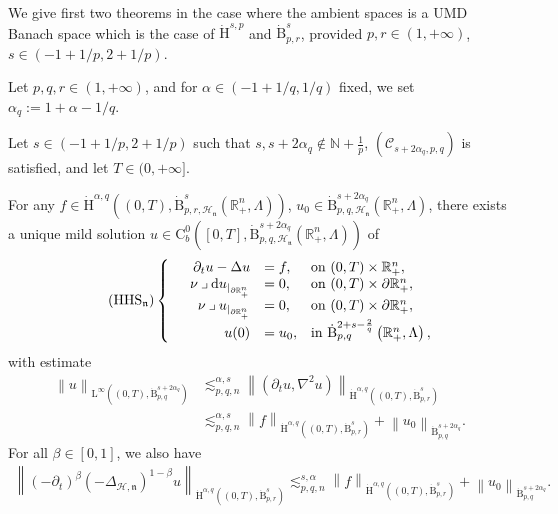\documentclass[AHL,Unicode,longabstracts,published]{cedram}
\newcommand{\bbR}{\mathbb{R}}
\newcommand{\bbN}{\mathbb{N}}
\newcommand{\rmH}{\mathrm{H}}%
\newcommand{\rmB}{\mathrm{B}}
\newcommand{\rmd}{\mathrm{d}}
\newcommand{\rmL}{\mathrm{L}}
\newcommand{\rmC}{\mathrm{C}}
\newcommand{\clH}{\mathcal{H}}
\newcommand{\clC}{\mathcal{C}}
\newcommand{\fkn}{\mathfrak{n}}
\newcommand{\iprod}{\mathbin{\lrcorner}}
\begin{document}
We give first two theorems in the case where the ambient spaces is a UMD Banach space which is the case of $\dot{\rmH}^{s,p}$ and $\dot{\rmB}^{s}_{p,r}$, provided $p,r\in(1,+\infty)$, $s\in(-1+1/p,2+1/p)$.

\begin{theo}\label{thm:MaxRxBesovUMDHodgeStokesRn+}
Let $p,q,r\in(1,+\infty)$, and for $\alpha\in(-1+1/q,1/q)$ fixed, we set $\alpha_q:= 1+\alpha-1/q$.

Let $s\in(-1+1/p,2+1/p)$ such that $s,s+2\alpha_q\notin \bbN +\frac{1}{p}$, $(\clC_{s+2\alpha_q,p,q})$ is satisfied, and let $T\in(0,+\infty]$.

For any $f\in \dot{\rmH}^{\alpha,q}((0,T),\dot{\rmB}^{s}_{p,r,\clH_\fkn}(\bbR^n_+,\Lambda))$, $u_0\in \dot{\rmB}^{s+2\alpha_q}_{p,q,\clH_\fkn}(\bbR^n_+,\Lambda)$, there exists a unique mild solution $u \in \rmC ^0_b([0,T],\dot{\rmB}^{s+2\alpha_q}_{p,q,\clH_\fkn}(\bbR^n_+,\Lambda))$ of
\begin{equation*}
\tag{HHS${}_{\fkn}$}\label{eq:HodgeHeatSystem}
\left\{
\begin{array}{rrll}
&{\partial_t u - \Delta u}  &{= f,} &{\text{on } (0,T)\times\bbR^n_+,}\\
&{\nu\iprod\rmd u_{|_{\partial\bbR^n_+}}} &{=  0,}
&{\text{on } (0,T)\times\partial\bbR^n_+,}\\
&{\nu\iprod u_{|_{\partial\bbR^n_+}}} &{=  0,}
&{\text{on } (0,T)\times\partial\bbR^n_+,}\\
&{u(0)} &{=  u_0,} &{\text{in } \dot{\rmB}^{2+s-\frac{2}{q}}_{p,q}\left(\bbR^n_+,\Lambda\right),}
\end{array}\right.
\end{equation*}
with estimate
\begin{align*}
\left\| u \right\|_{\rmL^\infty((0,T),\dot{\rmB}^{s+2\alpha_q}_{p,q})} &\lesssim_{p,q,n}^{\alpha,s} \left\| \left(\partial_t u, \nabla^2 u\right) \right\|_{\dot{\rmH}^{\alpha,q}\left((0,T),\dot{\rmB}^{s}_{p,r}\right)}\\
&\lesssim_{p,q,n}^{\alpha,s} \left\| f \right\|_{\dot{\rmH}^{\alpha,q}\left((0,T),\dot{\rmB}^{s}_{p,r}\right)}+ \left\| u_0 \right\|_{\dot{\rmB}^{s+2\alpha_q}_{p,q}}.
\end{align*}
For all $\beta\in[0,1]$, we also have
\begin{align}\label{eq:fractionalEstimatePruss1}
\left\| (-\partial_t)^\beta\left(-\Delta_\mathcal{H,\fkn}\right)^{1-\beta} u\right\|_{\dot{\rmH}^{\alpha,q}\left((0,T),\dot{\rmB}^{s}_{p,r}\right)} \lesssim_{p,q,n}^{s,\alpha} \left\| f \right\|_{\dot{\rmH}^{\alpha,q} \left((0,T),\dot{\rmB}^{s}_{p,r}\right)} + \left\| u_0 \right\|_{\dot{\rmB}^{s+2\alpha_q}_{p,q}}.
\end{align}
\end{theo}
\end{document}
